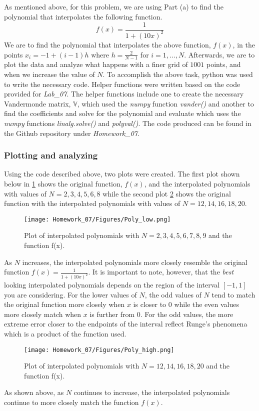 \documentclass{article}
\begin{document}
\subsection{}
As mentioned above, for this problem, we are using Part (a) to find the polynomial that interpolates the following function.
\[
f(x) = \frac{1}{1+(10x)^2}
\]
We are to find the polynomial that interpolates the above function, \(f(x)\), in the points \(x_i = -1+(i-1)h\) where \(h=\frac{2}{N-1}\) for \(i = 1, \dots, N\). Afterwards, we are to plot the data and analyze what happens with a finer grid of \(1001\) points, and when we increase the value of \(N\).
To accomplish the above task, python was used to write the necessary code. Helper functions were written based on the code provided for \textit{Lab\_07}. The helper functions include one to create the necessary Vandermonde matrix, \(\mathbf{\mathbb{V}}\), which used the \textit{numpy} function \textit{vander()} and another to find the coefficients and solve for the polynomial and evaluate which uses the \textit{numpy} functions \textit{linalg.solve()} and \textit{polyval()}. The code produced can be found in the Github repository under \textit{Homework\_07}.

\subsubsection{Plotting and analyzing}
Using the code described above, two plots were created. The first plot shown below in \ref{fig:Poly_Low} shows the original function, \(f(x)\), and the interpolated polynomials with values of \(N = 2,3,4,5,6,8\) while the second plot \ref{fig:Poly_High} shows the original function with the interpolated polynomials with values of \(N = 12,14,16,18,20\).
\begin{figure}[h!]
    \centering
    \texttt{[image: Homework\_07/Figures/Poly\_low.png]}
    \caption{Plot of interpolated polynomials with \(N=2,3,4,5,6,7,8,9\) and the function f(x).}
    \label{fig:Poly_Low}
\end{figure}
As \(N\) increases, the interpolated polynomials more closely resemble the original function \(f(x) = \frac{1}{1+(10x)^2}\). It is important to note, however, that the \textit{best} looking interpolated polynomials depends on the region of the interval \([-1,1]\) you are considering. For the lower values of \(N\), the odd values of \(N\) tend to match the original function more closely when \(x\) is closer to \(0\) while the even values more closely match when \(x\) is further from \(0\). For the odd values, the more extreme error closer to the endpoints of the interval reflect Runge's phenomena which is a product of the function used.
\newpage
\begin{figure}[h!]
    \centering
    \texttt{[image: Homework\_07/Figures/Poly\_high.png]}
    \caption{Plot of interpolated polynomials with \(N=12,14,16,18,20\) and the function f(x).}
    \label{fig:Poly_High}
\end{figure}
As shown above, as \(N\) continues to increase, the interpolated polynomials continue to more closely match the function \(f(x)\).
\end{document}
